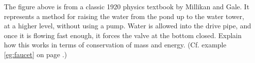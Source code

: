 The figure above is from a classic 1920 physics textbook
by Millikan and Gale. It represents a method for raising the
water from the pond up to the water tower, at a higher level,
without using a pump. Water is allowed into the drive pipe,
and once it is flowing fast enough, it forces the valve at the
bottom closed. Explain how this works in terms of conservation
of mass and energy. (Cf. example \ref{eg:faucet} on page \pageref{eg:faucet}.)
